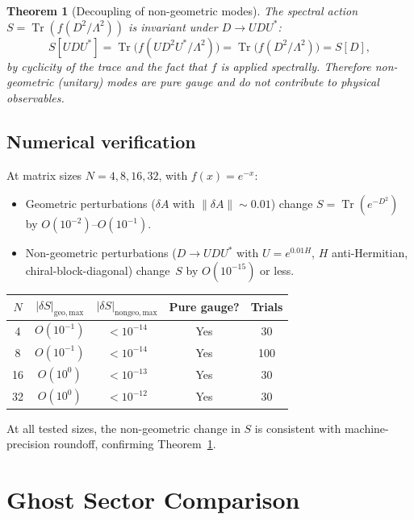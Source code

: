 \documentclass[12pt,a4paper]{article}
\newcommand{\Tr}{\operatorname{Tr}}
\newcommand{\Lam}{\Lambda}
\newtheorem{theorem}{Theorem}[section]
\theoremstyle{definition}
\theoremstyle{remark}
\begin{document}
\begin{theorem}[Decoupling of non-geometric modes]
\label{thm:decoupling}
The spectral action $S = \Tr(f(D^2/\Lam^2))$ is invariant under
$D \to U D U^*$:
\begin{equation}
  S[UDU^*] = \Tr\!\bigl(f(UD^2U^*/\Lam^2)\bigr)
  = \Tr\!\bigl(f(D^2/\Lam^2)\bigr) = S[D],
\end{equation}
by cyclicity of the trace and the fact that $f$ is applied spectrally.
Therefore non-geometric (unitary) modes are pure gauge and do not
contribute to physical observables.
\end{theorem}

\subsection{Numerical verification}

At matrix sizes $N = 4, 8, 16, 32$, with $f(x) = e^{-x}$:
\begin{itemize}
  \item Geometric perturbations ($\delta A$ with $\|\delta A\| \sim 0.01$)
    change $S = \Tr(e^{-D^2})$ by $O(10^{-2})$--$O(10^{-1})$.
  \item Non-geometric perturbations ($D \to U D U^*$ with
    $U = e^{0.01 H}$, $H$ anti-Hermitian, chiral-block-diagonal)
    change~$S$ by $O(10^{-15})$ or less.
\end{itemize}

\begin{center}
\begin{tabular}{ccccc}
\toprule
$N$ & $|\delta S|_{\mathrm{geo,max}}$ & $|\delta S|_{\mathrm{nongeo,max}}$
& Pure gauge? & Trials \\
\midrule
4  & $O(10^{-1})$ & $< 10^{-14}$ & Yes & 30 \\
8  & $O(10^{-1})$ & $< 10^{-14}$ & Yes & 100 \\
16 & $O(10^{0})$  & $< 10^{-13}$ & Yes & 30 \\
32 & $O(10^{0})$  & $< 10^{-12}$ & Yes & 30 \\
\bottomrule
\end{tabular}
\end{center}

At all tested sizes, the non-geometric change in $S$ is consistent with
machine-precision roundoff, confirming Theorem~\ref{thm:decoupling}.

\section{Ghost Sector Comparison}
\label{sec:ghosts}
\end{document}
